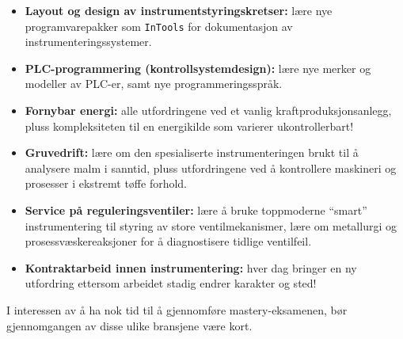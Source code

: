\begin{itemize}
\begin{itemize}
\item{} Eksempel: ``smart grid''-instrumentering
\item{} Eksempel: kryptering og sikkerhet i kontrollnettverk
\end{itemize}
\item{} {\bf Layout og design av instrumentstyringskretser:} lære nye programvarepakker som {\tt InTools} for dokumentasjon av instrumenteringssystemer.
\item{} {\bf PLC-programmering (kontrollsystemdesign):} lære nye merker og modeller av PLC-er, samt nye programmeringsspråk.
\item{} {\bf Fornybar energi:} alle utfordringene ved et vanlig kraftproduksjonsanlegg, pluss kompleksiteten til en energikilde som varierer ukontrollerbart!
\item{} {\bf Gruvedrift:} lære om den spesialiserte instrumenteringen brukt til å analysere malm i sanntid, pluss utfordringene ved å kontrollere maskineri og prosesser i ekstremt tøffe forhold.
\item{} {\bf Service på reguleringsventiler:} lære å bruke toppmoderne ``smart'' instrumentering til styring av store ventilmekanismer, lære om metallurgi og prosessvæskereaksjoner for å diagnostisere tidlige ventilfeil.
\item{} {\bf Kontraktarbeid innen instrumentering:} hver dag bringer en ny utfordring ettersom arbeidet stadig endrer karakter og sted!
\end{itemize}



I interessen av å ha nok tid til å gjennomføre mastery-eksamenen, bør gjennomgangen av disse ulike bransjene være kort.


